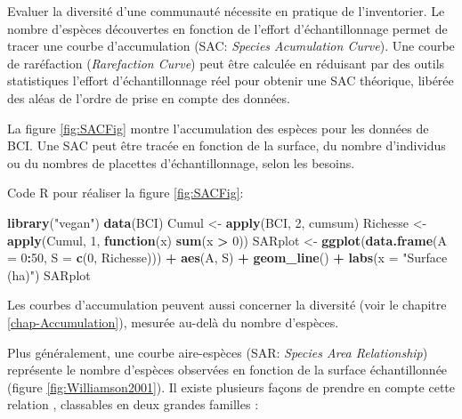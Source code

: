 \documentclass[
  11pt,
  french,
  a4paper,
  extrafontsizes,onecolumn,openright
  ]{memoir}
\newenvironment{Shaded}{\begin{snugshade}}{\end{snugshade}}
\newcommand{\ControlFlowTok}[1]{\textcolor[rgb]{0.13,0.29,0.53}{\textbf{#1}}}
\newcommand{\DataTypeTok}[1]{\textcolor[rgb]{0.13,0.29,0.53}{#1}}
\newcommand{\DecValTok}[1]{\textcolor[rgb]{0.00,0.00,0.81}{#1}}
\newcommand{\KeywordTok}[1]{\textcolor[rgb]{0.13,0.29,0.53}{\textbf{#1}}}
\newcommand{\NormalTok}[1]{#1}
\newcommand{\OperatorTok}[1]{\textcolor[rgb]{0.81,0.36,0.00}{\textbf{#1}}}
\newcommand{\StringTok}[1]{\textcolor[rgb]{0.31,0.60,0.02}{#1}}
\newlength{\rf}
\begin{document}
\normalsize

Evaluer la diversité d'une communauté nécessite en pratique de l'inventorier.
Le nombre d'espèces découvertes en fonction de l'effort d'échantillonnage permet de tracer une courbe d'accumulation (SAC: \emph{Species Acumulation Curve}).
Une courbe de raréfaction (\emph{Rarefaction Curve}) peut être calculée en réduisant par des outils statistiques l'effort d'échantillonnage réel pour obtenir une SAC théorique, libérée des aléas de l'ordre de prise en compte des données.

La figure \ref{fig:SACFig} montre l'accumulation des espèces pour les données de BCI.
Une SAC peut être tracée en fonction de la surface, du nombre d'individus ou du nombres de placettes d'échantillonnage, selon les besoins.

Code R pour réaliser la figure \ref{fig:SACFig}:

\scriptsize

\begin{Shaded}
\begin{Highlighting}[]
\KeywordTok{library}\NormalTok{(}\StringTok{"vegan"}\NormalTok{)}
\KeywordTok{data}\NormalTok{(BCI)}
\NormalTok{Cumul <-}\StringTok{ }\KeywordTok{apply}\NormalTok{(BCI, }\DecValTok{2}\NormalTok{, cumsum)}
\NormalTok{Richesse <-}\StringTok{ }\KeywordTok{apply}\NormalTok{(Cumul, }\DecValTok{1}\NormalTok{, }\ControlFlowTok{function}\NormalTok{(x) }\KeywordTok{sum}\NormalTok{(x }\OperatorTok{>}\StringTok{ }\DecValTok{0}\NormalTok{))}
\NormalTok{SARplot <-}\StringTok{ }\KeywordTok{ggplot}\NormalTok{(}\KeywordTok{data.frame}\NormalTok{(}\DataTypeTok{A =} \DecValTok{0}\OperatorTok{:}\DecValTok{50}\NormalTok{, }
                             \DataTypeTok{S =} \KeywordTok{c}\NormalTok{(}\DecValTok{0}\NormalTok{, Richesse))) }\OperatorTok{+}
\StringTok{  }\KeywordTok{aes}\NormalTok{(A, S) }\OperatorTok{+}
\StringTok{  }\KeywordTok{geom_line}\NormalTok{() }\OperatorTok{+}
\StringTok{  }\KeywordTok{labs}\NormalTok{(}\DataTypeTok{x =} \StringTok{"Surface (ha)"}\NormalTok{)}
\NormalTok{SARplot}
\end{Highlighting}
\end{Shaded}

\normalsize

Les courbes d'accumulation peuvent aussi concerner la diversité (voir le chapitre \ref{chap-Accumulation}), mesurée au-delà du nombre d'espèces.

Plus généralement, une courbe aire-espèces (SAR: \emph{Species Area Relationship}) représente le nombre d'espèces observées en fonction de la surface échantillonnée (figure \ref{fig:Williamson2001}).
Il existe plusieurs façons de prendre en compte cette relation \autocite{Scheiner2003}, classables en deux grandes familles \autocite{Dengler2009}:
\end{document}
